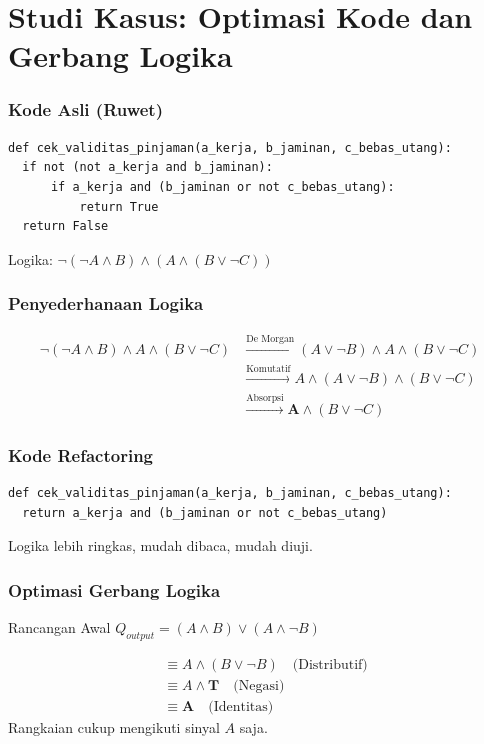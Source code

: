 \documentclass[handout]{beamer}
\theoremstyle{definition}
\theoremstyle{example}
\begin{document}
\section{Studi Kasus: Optimasi Kode dan Gerbang Logika}

\begin{frame}[fragile]
\frametitle{Kode Asli (Ruwet)}
\begin{lstlisting}[basicstyle=\ttfamily\scriptsize, frame=single]
def cek_validitas_pinjaman(a_kerja, b_jaminan, c_bebas_utang):
  if not (not a_kerja and b_jaminan):
      if a_kerja and (b_jaminan or not c_bebas_utang):
          return True
  return False
\end{lstlisting}
Logika: $\neg(\neg A \wedge B) \wedge (A \wedge (B \vee \neg C))$
\end{frame}

\begin{frame}
\frametitle{Penyederhanaan Logika}
\begin{align*}
\neg(\neg A \wedge B) \wedge A \wedge (B \vee \neg C) &\xrightarrow{\text{De Morgan}} (A \vee \neg B) \wedge A \wedge (B \vee \neg C) \\
&\xrightarrow{\text{Komutatif}} A \wedge (A \vee \neg B) \wedge (B \vee \neg C) \\
&\xrightarrow{\text{Absorpsi}} \mathbf{A} \wedge (B \vee \neg C)
\end{align*}
\end{frame}

\begin{frame}[fragile]
\frametitle{Kode Refactoring}
\begin{lstlisting}[basicstyle=\ttfamily\scriptsize, frame=single]
def cek_validitas_pinjaman(a_kerja, b_jaminan, c_bebas_utang):
  return a_kerja and (b_jaminan or not c_bebas_utang)
\end{lstlisting}
Logika lebih ringkas, mudah dibaca, mudah diuji.
\end{frame}

\begin{frame}
\frametitle{Optimasi Gerbang Logika}
\begin{block}{Rancangan Awal}
$Q_{output} = (A \wedge B) \vee (A \wedge \neg B)$
\end{block}
\begin{align*}
&\equiv A \wedge (B \vee \neg B) \quad \text{(Distributif)} \\
&\equiv A \wedge \mathbf{T} \quad \text{(Negasi)} \\
&\equiv \mathbf{A} \quad \text{(Identitas)}
\end{align*}
Rangkaian cukup mengikuti sinyal $A$ saja.
\end{frame}
\end{document}
